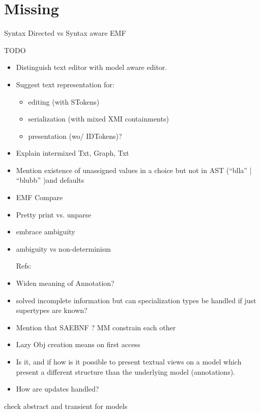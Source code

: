 \section{Missing}
Syntax Directed vs Syntax aware
EMF

TODO
\begin{itemize}
	\item Distinguish text editor with model aware editor.
	\item Suggest text representation for: 
	\begin{itemize}
		\item editing (with STokens)
		\item serialization (with mixed XMI containments)
		\item presentation (wo/ IDTokens)?
	\end{itemize}
	
	\item Explain intermixed Txt, Graph, Txt
	\item Mention existence of unassigned values in a choice but not in AST (``blla'' | ``blubb'' )and defaults
	\item EMF Compare
	\item Pretty print vs. unparse

	\item embrace ambiguity
	\item ambiguity vs non-determinism

	

Refs:
	\item Widen meaning of Annotation?
	\item solved incomplete information but can specialization types be handled if just supertypes are known? 
	\item Mention that SAEBNF ? MM constrain each other
	\item Lazy Obj creation means on first access
	\end{itemize}


\begin{itemize}
	\item Is it, and if how is it possible to present textual views on a model which present a different structure than the underlying model (annotations).
		\item  How are updates handled?
\end{itemize}

check abstract and transient for models 